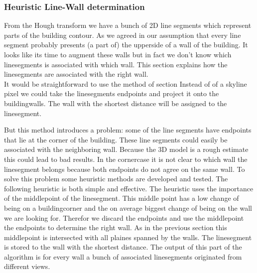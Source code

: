 \documentclass[10pt]{article}
\begin{document}
\subsubsection{Heuristic Line-Wall determination}
	From the Hough transform we have a bunch of 2D line segments which represent parts of the building contour. 
	As we agreed in our assumption that every line segment probably presents (a part of) the upperside of a wall of the building.
	It looks like its time to augment these walls but in fact we don't know which linesegments is associated with which wall.
	This section explains how the linesegments are associated with the right wall.\\

	It would be straightforward to use the method of section %
	Instead of of a skyline pixel we could take the linesegments endpoints and project it onto the buildingwalls. The wall with the shortest distance will be assigned to the linesegment.

	But this method introduces a problem: some of the line segments have endpoints that lie at the corner of the building. These line segments could easily be associated with the neighboring wall. Because the 3D model is a rough estimate this could lead to bad results.
	In the cornercase it is not clear to which wall the linesegment belongs because both endpoints do not agree on the same wall. To solve this problem some heuristic methods are developed and tested. The following heuristic is both simple and effective.
	The heuristic uses the importance of the middlepoint of the linesegment. This middle point has a low change of being on a buildingcorner and the on average biggest change of being on the wall we are looking for.
	Therefor we discard the endpoints and use the middlepoint the endpoints to determine the right wall.
	As in the previous section %
	this middlepoint is intersected with all plaines spanned by the walls. The linesegment is stored to the wall with the shortest distance.
	The output of this part of the algorithm is for every wall a bunch of associated linesegments originated from different views.

\end{document}
